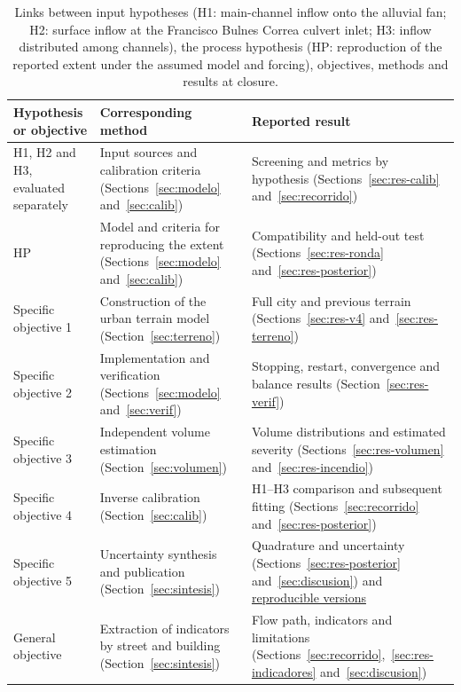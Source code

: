 \begin{table}[htbp]\centering\small
\caption{Links between input hypotheses (H1: main-channel inflow onto the alluvial fan; H2: surface inflow at the Francisco Bulnes Correa culvert inlet; H3: inflow distributed among channels), the process hypothesis (HP: reproduction of the reported extent under the assumed model and forcing), objectives, methods and results at closure.}\label{tab:correspondencia}
\begin{tabular}{@{}>{\raggedright\arraybackslash}p{}>{\raggedright\arraybackslash}p{}>{\raggedright\arraybackslash}p{}@{}}\toprule
Hypothesis or objective & Corresponding method & Reported result\\\midrule
H1, H2 and H3, evaluated separately & Input sources and calibration criteria (Sections~\ref{sec:modelo} and~\ref{sec:calib}) & Screening and metrics by hypothesis (Sections~\ref{sec:res-calib} and~\ref{sec:recorrido})\\
HP & Model and criteria for reproducing the extent (Sections~\ref{sec:modelo} and~\ref{sec:calib}) & Compatibility and held-out test (Sections~\ref{sec:res-ronda} and~\ref{sec:res-posterior})\\
Specific objective 1 & Construction of the urban terrain model (Section~\ref{sec:terreno}) & Full city and previous terrain (Sections~\ref{sec:res-v4} and~\ref{sec:res-terreno})\\
Specific objective 2 & Implementation and verification (Sections~\ref{sec:modelo} and~\ref{sec:verif}) & Stopping, restart, convergence and balance results (Section~\ref{sec:res-verif})\\
Specific objective 3 & Independent volume estimation (Section~\ref{sec:volumen}) & Volume distributions and estimated severity (Sections~\ref{sec:res-volumen} and~\ref{sec:res-incendio})\\
Specific objective 4 & Inverse calibration (Section~\ref{sec:calib}) & H1--H3 comparison and subsequent fitting (Sections~\ref{sec:recorrido} and~\ref{sec:res-posterior})\\
Specific objective 5 & Uncertainty synthesis and publication (Section~\ref{sec:sintesis}) & Quadrature and uncertainty (Sections~\ref{sec:res-posterior} and~\ref{sec:discusion}) and \hyperref[sec:versiones]{reproducible versions}\\
General objective & Extraction of indicators by street and building (Section~\ref{sec:sintesis}) & Flow path, indicators and limitations (Sections~\ref{sec:recorrido},~\ref{sec:res-indicadores} and~\ref{sec:discusion})\\\bottomrule
\end{tabular}
\end{table}

